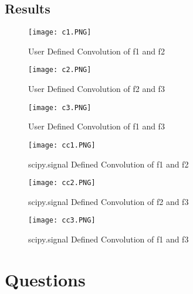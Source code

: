\subsection{Results}

\begin{figure}[H]
	\centering
	\texttt{[image: c1.PNG]}
	\caption{User Defined Convolution of f1 and f2}
\end{figure}

\begin{figure}[H]
	\centering
	\texttt{[image: c2.PNG]}
	\caption{User Defined Convolution of f2 and f3}
\end{figure}

\begin{figure}[H]
	\centering
	\texttt{[image: c3.PNG]}
	\caption{User Defined Convolution of f1 and f3}
\end{figure}

\begin{figure}[H]
	\centering
	\texttt{[image: cc1.PNG]}
	\caption{scipy.signal Defined Convolution of f1 and f2}
\end{figure}

\begin{figure}[H]
	\centering
	\texttt{[image: cc2.PNG]}
	\caption{scipy.signal Defined Convolution of f2 and f3}
\end{figure}

\begin{figure}[H]
	\centering
	\texttt{[image: cc3.PNG]}
	\caption{scipy.signal Defined Convolution of f1 and f3}
\end{figure}


\section{Questions}

